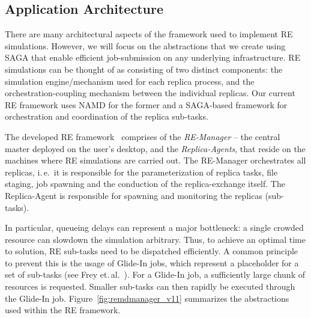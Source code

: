 \documentclass{llncs}
\begin{document}

\up

\subsection{Application Architecture}

\up


There are many architectural aspects of the framework used to
implement RE simulations. However, we will focus on the abstractions
that we create using SAGA that enable efficient job-submission on any
underlying infrastructure.  RE simulations can be thought of as
consisting of two distinct components: the simulation engine/mechanism
used for each replica process, and the orchestration-coupling
mechanism between the individual replicas. Our current RE framework
uses NAMD for the former and a SAGA-based framework for orchestration
and coordination of the replica sub-tasks.

The developed RE framework~\cite{Luckow:2008la} comprises of the
\emph{RE-Manager} -- the central master deployed on the user's
desktop, and the \textit{Replica-Agents}, that reside on the machines
where RE simulations are carried out. The RE-Manager orchestrates all
replicas, i.\,e.\ it is responsible for the parameterization of
replica tasks, file staging, job spawning and the conduction of the
replica-exchange itself.  The Replica-Agent %
is responsible for spawning and monitoring the replicas (sub-tasks).

In particular, queueing delays can represent a major bottleneck: a
single crowded resource can slowdown the simulation arbitrary. Thus,
to achieve an optimal time to solution, RE sub-tasks need to be
dispatched efficiently.  A common principle to prevent this is the
usage of Glide-In jobs, which represent a placeholder for a set of
sub-tasks (see Frey et.\,al.~\cite{citeulike:291860}).  For a Glide-In
job, a sufficiently large chunk of resources is requested. Smaller
sub-tasks can then rapidly be executed through the Glide-In job.
Figure~\ref{fig:remdmanager_v11} summarizes the abstractions used
within the RE framework.
\end{document}
